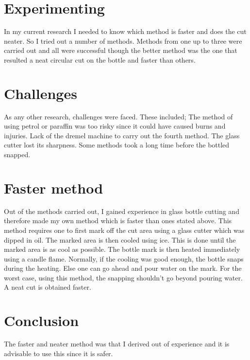 \documentclass[12pt]{article}
\begin{document}
\section{Experimenting}
In my current research I needed to know which method is faster and does the cut neater. So I tried out a number of methods. Methods from one up to three were carried out and all were successful though the better method was the one that resulted a neat circular cut on the bottle and faster than others.
\section{Challenges}
As any other research, challenges were faced. These included;
The method of using petrol or paraffin was too risky since it could have caused burns and injuries.
Lack of the dremel machine to carry out the fourth method.
The glass cutter lost its sharpness.
Some methods took a long time before the bottled snapped.

\section{Faster method}
Out of the methods carried out, I gained experience in glass bottle cutting and therefore made my own method which is faster than ones stated above. This method requires one to first mark off the cut area using a glass cutter which was dipped in oil. The marked area is then cooled using ice. This is done until the marked area is as cool as possible. The bottle mark is then heated immediately using a candle flame. Normally, if the cooling was good enough, the bottle snaps during the heating. Else one can go ahead and pour water on the mark. For the worst case, using this method, the snapping shouldn’t go beyond pouring water. A neat cut is obtained faster.
\section{Conclusion}
The faster and neater method was that I derived out of experience and it is advisable to use this since it is safer.
\end{document}
